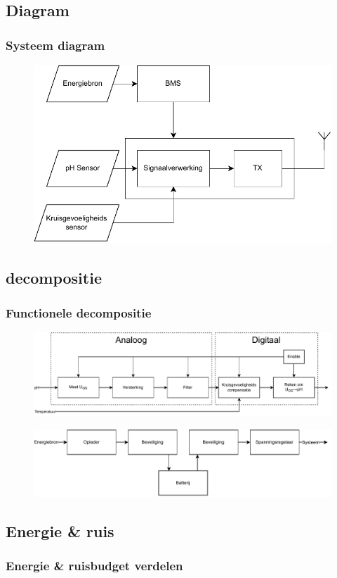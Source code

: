     \subsection*{Diagram}
    \begin{frame}
        \frametitle{Systeem diagram}
        
        \begin{figure}
            \centering
            \includegraphics[width=\textwidth]{img/system.pdf}
        \end{figure}
            
    \end{frame}
        
    
    \subsection*{decompositie}
    \begin{frame}
        \frametitle{Functionele decompositie}
        \begin{figure}
            \centering
            \includegraphics[width=\textwidth]{img/decompSignal.pdf}
        \end{figure}
        \begin{figure}
            \centering
            \includegraphics[width=\textwidth]{img/funcdDecompEnergy.pdf}
        \end{figure}    
    \end{frame}
    \subsection*{Energie \& ruis}
    \begin{frame}
        \frametitle{Energie \& ruisbudget verdelen}
    
        
    
    \end{frame}